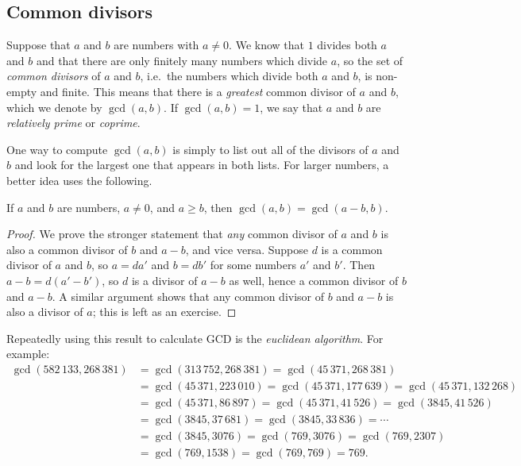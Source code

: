 \subsection{Common divisors}

Suppose that $a$ and $b$ are numbers with $a\neq 0$. We know that $1$ divides both $a$ and $b$ and that there are only finitely many numbers which divide $a$, so the set of \emph{common divisors} of $a$ and $b$, i.e.\ the numbers which divide both $a$ and $b$, is non-empty and finite. This means that there is a \emph{greatest} common divisor of $a$ and $b$, which we denote by $\gcd(a,b)$. If $\gcd(a,b) = 1$, we say that $a$ and $b$ are \emph{relatively prime} or \emph{coprime}.

One way to compute $\gcd(a,b)$ is simply to list out all of the divisors of $a$ and $b$ and look for the largest one that appears in both lists. For larger numbers, a better idea uses the following.

\begin{proposition}
If $a$ and $b$ are numbers, $a\neq 0$, and $a\geq b$, then $\gcd(a,b) = \gcd(a - b, b)$.
\end{proposition}
\begin{proof}
We prove the stronger statement that \textit{any} common divisor of $a$ and $b$ is also a common divisor of $b$ and $a - b$, and vice versa. Suppose $d$ is a common divisor of $a$ and $b$, so $a = da'$ and $b = db'$ for some numbers $a'$ and $b'$. Then $a - b = d(a' - b')$, so $d$ is a divisor of $a - b$ as well, hence a common divisor of $b$ and $a - b$. A similar argument shows that any common divisor of $b$ and $a - b$ is also a divisor of $a$; this is left as an exercise.
\end{proof}
Repeatedly using this result to calculate GCD is the \emph{euclidean algorithm}. For example:
\begin{align*}
\gcd(582\,133, 268\,381) &= \gcd(313\,752, 268\,381) = \gcd(45\,371, 268\,381) \\
&= \gcd(45\,371, 223\,010) = \gcd(45\,371, 177\,639) = \gcd(45\,371, 132\,268) \\
&= \gcd(45\,371, 86\,897) = \gcd(45\,371, 41\,526) = \gcd(3845, 41\,526) \\
&= \gcd(3845, 37\,681) = \gcd(3845, 33\,836) = \cdots \\
&= \gcd(3845, 3076) = \gcd(769, 3076) = \gcd(769, 2307) \\
&= \gcd(769, 1538) = \gcd(769, 769) = \boxed{769}.
\end{align*}

